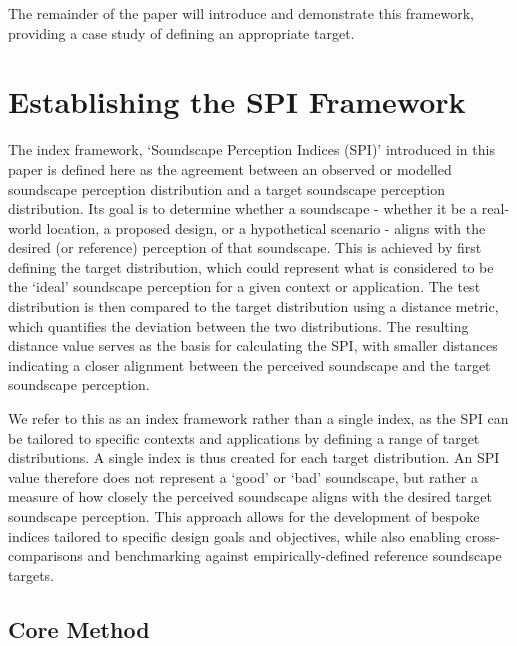 \documentclass[
  authoryear,
  preprint,
  1p]{elsarticle}
\begin{document}
The remainder of the paper will introduce and demonstrate this
framework, providing a case study of defining an appropriate target.

\section{Establishing the SPI Framework}\label{sec-method}

The index framework, `Soundscape Perception Indices (SPI)' introduced in
this paper is defined here as the agreement between an observed or
modelled soundscape perception distribution and a target soundscape
perception distribution. Its goal is to determine whether a soundscape -
whether it be a real-world location, a proposed design, or a
hypothetical scenario - aligns with the desired (or reference)
perception of that soundscape. This is achieved by first defining the
target distribution, which could represent what is considered to be the
`ideal' soundscape perception for a given context or application. The
test distribution is then compared to the target distribution using a
distance metric, which quantifies the deviation between the two
distributions. The resulting distance value serves as the basis for
calculating the SPI, with smaller distances indicating a closer
alignment between the perceived soundscape and the target soundscape
perception.

We refer to this as an index framework rather than a single index, as
the SPI can be tailored to specific contexts and applications by
defining a range of target distributions. A single index is thus created
for each target distribution. An SPI value therefore does not represent
a `good' or `bad' soundscape, but rather a measure of how closely the
perceived soundscape aligns with the desired target soundscape
perception. This approach allows for the development of bespoke indices
tailored to specific design goals and objectives, while also enabling
cross-comparisons and benchmarking against empirically-defined reference
soundscape targets.

\subsection{Core Method}\label{sec-core-method}
\end{document}
